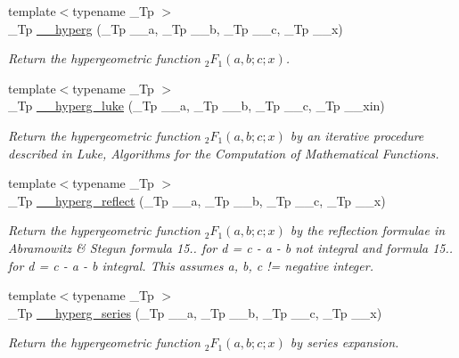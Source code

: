 \begin{DoxyCompactItemize}
\item 
{\footnotesize template$<$typename \+\_\+\+Tp $>$ }\\\+\_\+\+Tp \hyperlink{namespacestd_1_1____detail_a316589a60d5e5f50201c2d42b980678c}{\+\_\+\+\_\+hyperg} (\+\_\+\+Tp \+\_\+\+\_\+a, \+\_\+\+Tp \+\_\+\+\_\+b, \+\_\+\+Tp \+\_\+\+\_\+c, \+\_\+\+Tp \+\_\+\+\_\+x)
\begin{DoxyCompactList}\small\item\em Return the hypergeometric function $ _2F_1(a,b;c;x) $. \end{DoxyCompactList}\item 
{\footnotesize template$<$typename \+\_\+\+Tp $>$ }\\\+\_\+\+Tp \hyperlink{namespacestd_1_1____detail_a0c1ec62b5c39c93ad70a8229a7a6d84d}{\+\_\+\+\_\+hyperg\+\_\+luke} (\+\_\+\+Tp \+\_\+\+\_\+a, \+\_\+\+Tp \+\_\+\+\_\+b, \+\_\+\+Tp \+\_\+\+\_\+c, \+\_\+\+Tp \+\_\+\+\_\+xin)
\begin{DoxyCompactList}\small\item\em Return the hypergeometric function $ _2F_1(a,b;c;x) $ by an iterative procedure described in Luke, Algorithms for the Computation of Mathematical Functions. \end{DoxyCompactList}\item 
{\footnotesize template$<$typename \+\_\+\+Tp $>$ }\\\+\_\+\+Tp \hyperlink{namespacestd_1_1____detail_a3c3baddc93bfaf1cb368d4b74e53542d}{\+\_\+\+\_\+hyperg\+\_\+reflect} (\+\_\+\+Tp \+\_\+\+\_\+a, \+\_\+\+Tp \+\_\+\+\_\+b, \+\_\+\+Tp \+\_\+\+\_\+c, \+\_\+\+Tp \+\_\+\+\_\+x)
\begin{DoxyCompactList}\small\item\em Return the hypergeometric function $ _2F_1(a,b;c;x) $ by the reflection formulae in Abramowitz \& Stegun formula 15.. for d = c -\/ a -\/ b not integral and formula 15.. for d = c -\/ a -\/ b integral. This assumes a, b, c != negative integer. \end{DoxyCompactList}\item 
{\footnotesize template$<$typename \+\_\+\+Tp $>$ }\\\+\_\+\+Tp \hyperlink{namespacestd_1_1____detail_ad234e0d31f55cd3748169dccb2533c6a}{\+\_\+\+\_\+hyperg\+\_\+series} (\+\_\+\+Tp \+\_\+\+\_\+a, \+\_\+\+Tp \+\_\+\+\_\+b, \+\_\+\+Tp \+\_\+\+\_\+c, \+\_\+\+Tp \+\_\+\+\_\+x)
\begin{DoxyCompactList}\small\item\em Return the hypergeometric function $ _2F_1(a,b;c;x) $ by series expansion. \end{DoxyCompactList}\item 

\end{DoxyCompactItemize}
